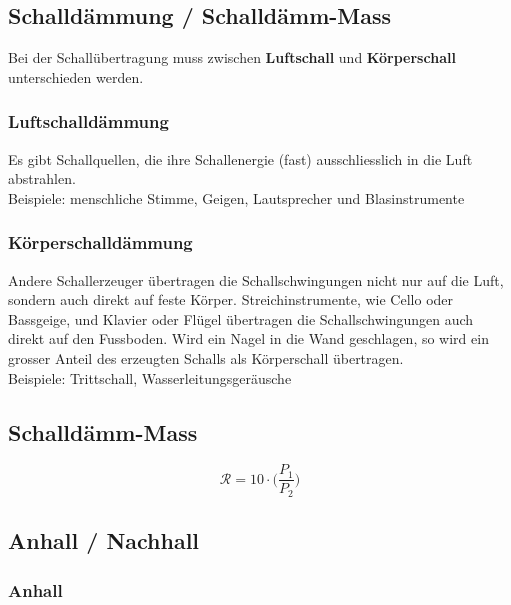 \subsection{Schalldämmung / Schalldämm-Mass}

Bei der Schallübertragung muss zwischen \textbf{Luftschall} und \textbf{Körperschall}
unterschieden werden.

\subsubsection{Luftschalldämmung}

Es gibt Schallquellen, die ihre Schallenergie (fast)
ausschliesslich in die Luft abstrahlen.\\
Beispiele: menschliche Stimme, Geigen, Lautsprecher und Blasinstrumente

\subsubsection{Körperschalldämmung}

Andere Schallerzeuger übertragen die Schallschwingungen nicht nur auf die
Luft, sondern auch direkt auf feste Körper. Streichinstrumente, wie Cello oder
Bassgeige, und Klavier oder Flügel übertragen die Schallschwingungen auch
direkt auf den Fussboden. Wird ein Nagel in die Wand geschlagen, so wird ein
grosser Anteil des erzeugten Schalls als Körperschall übertragen. \\
Beispiele: Trittschall, Wasserleitungsgeräusche \\




\subsection{Schalldämm-Mass}

$$ \boxed{ \mathcal{R} = 10 \cdot \Big( \frac{P_1}{P_2} \Big)  } $$



\subsection{Anhall / Nachhall}

\subsubsection{Anhall}

